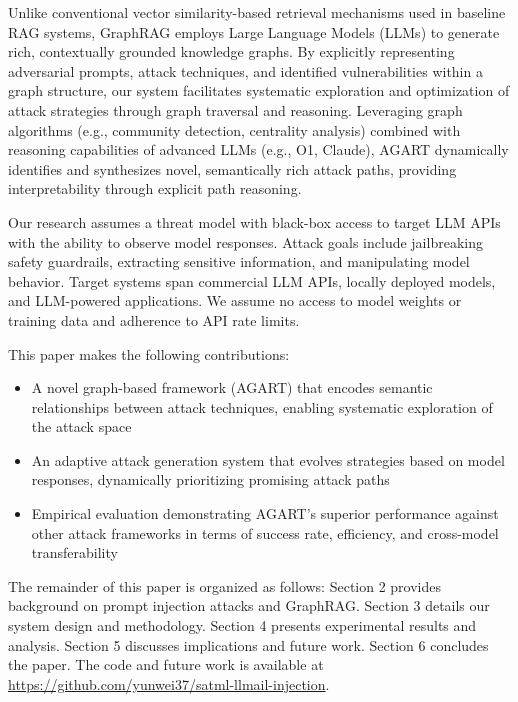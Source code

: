 Unlike conventional vector similarity-based retrieval mechanisms used in baseline RAG systems, GraphRAG employs Large Language Models (LLMs) to generate rich, contextually grounded knowledge graphs. By explicitly representing adversarial prompts, attack techniques, and identified vulnerabilities within a graph structure, our system facilitates systematic exploration and optimization of attack strategies through graph traversal and reasoning. Leveraging graph algorithms (e.g., community detection, centrality analysis) combined with reasoning capabilities of advanced LLMs (e.g., O1, Claude), AGART dynamically identifies and synthesizes novel, semantically rich attack paths, providing interpretability through explicit path reasoning.

Our research assumes a threat model with black-box access to target LLM APIs with the ability to observe model responses. Attack goals include jailbreaking safety guardrails, extracting sensitive information, and manipulating model behavior. Target systems span commercial LLM APIs, locally deployed models, and LLM-powered applications. We assume no access to model weights or training data and adherence to API rate limits.

This paper makes the following contributions:
\begin{itemize}
\item A novel graph-based framework (AGART) that encodes semantic relationships between attack techniques, enabling systematic exploration of the attack space
\item An adaptive attack generation system that evolves strategies based on model responses, dynamically prioritizing promising attack paths
\item Empirical evaluation demonstrating AGART's superior performance against other attack frameworks in terms of success rate, efficiency, and cross-model transferability
\end{itemize}

The remainder of this paper is organized as follows: Section 2 provides background on prompt injection attacks and GraphRAG. Section 3 details our system design and methodology. Section 4 presents experimental results and analysis. Section 5 discusses implications and future work. Section 6 concludes the paper. The code and future work is available at \url{https://github.com/yunwei37/satml-llmail-injection}.